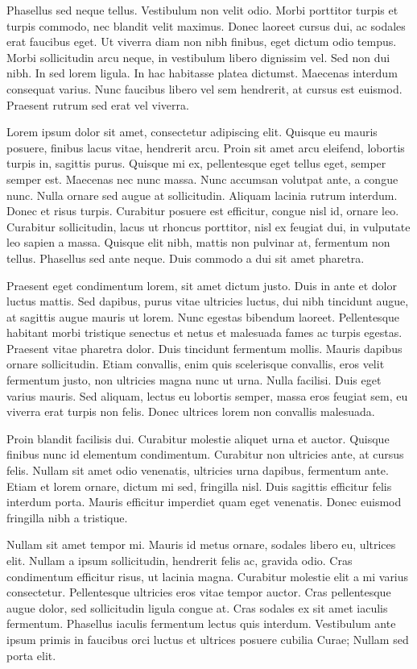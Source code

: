 \documentclass{article}
\begin{document}
Phasellus sed neque tellus. Vestibulum non velit odio. Morbi porttitor turpis et turpis commodo, nec blandit velit maximus. Donec laoreet cursus dui, ac sodales erat faucibus eget. Ut viverra diam non nibh finibus, eget dictum odio tempus. Morbi sollicitudin arcu neque, in vestibulum libero dignissim vel. Sed non dui nibh. In sed lorem ligula. In hac habitasse platea dictumst. Maecenas interdum consequat varius. Nunc faucibus libero vel sem hendrerit, at cursus est euismod. Praesent rutrum sed erat vel viverra. 

	Lorem ipsum dolor sit amet, consectetur adipiscing elit. Quisque eu mauris posuere, finibus lacus vitae, hendrerit arcu. Proin sit amet arcu eleifend, lobortis turpis in, sagittis purus. Quisque mi ex, pellentesque eget tellus eget, semper semper est. Maecenas nec nunc massa. Nunc accumsan volutpat ante, a congue nunc. Nulla ornare sed augue at sollicitudin. Aliquam lacinia rutrum interdum. Donec et risus turpis. Curabitur posuere est efficitur, congue nisl id, ornare leo. Curabitur sollicitudin, lacus ut rhoncus porttitor, nisl ex feugiat dui, in vulputate leo sapien a massa. Quisque elit nibh, mattis non pulvinar at, fermentum non tellus. Phasellus sed ante neque. Duis commodo a dui sit amet pharetra.


Praesent eget condimentum lorem, sit amet dictum justo. Duis in ante et dolor luctus mattis. Sed dapibus, purus vitae ultricies luctus, dui nibh tincidunt augue, at sagittis augue mauris ut lorem. Nunc egestas bibendum laoreet. Pellentesque habitant morbi tristique senectus et netus et malesuada fames ac turpis egestas. Praesent vitae pharetra dolor. Duis tincidunt fermentum mollis. Mauris dapibus ornare sollicitudin. Etiam convallis, enim quis scelerisque convallis, eros velit fermentum justo, non ultricies magna nunc ut urna. Nulla facilisi. Duis eget varius mauris. Sed aliquam, lectus eu lobortis semper, massa eros feugiat sem, eu viverra erat turpis non felis. Donec ultrices lorem non convallis malesuada.


Proin blandit facilisis dui. Curabitur molestie aliquet urna et auctor. Quisque finibus nunc id elementum condimentum. Curabitur non ultricies ante, at cursus felis. Nullam sit amet odio venenatis, ultricies urna dapibus, fermentum ante. Etiam et lorem ornare, dictum mi sed, fringilla nisl. Duis sagittis efficitur felis interdum porta. Mauris efficitur imperdiet quam eget venenatis. Donec euismod fringilla nibh a tristique.

Nullam sit amet tempor mi. Mauris id metus ornare, sodales libero eu, ultrices elit. Nullam a ipsum sollicitudin, hendrerit felis ac, gravida odio. Cras condimentum efficitur risus, ut lacinia magna. Curabitur molestie elit a mi varius consectetur. Pellentesque ultricies eros vitae tempor auctor. Cras pellentesque augue dolor, sed sollicitudin ligula congue at. Cras sodales ex sit amet iaculis fermentum. Phasellus iaculis fermentum lectus quis interdum. Vestibulum ante ipsum primis in faucibus orci luctus et ultrices posuere cubilia Curae; Nullam sed porta elit.
\end{document}
